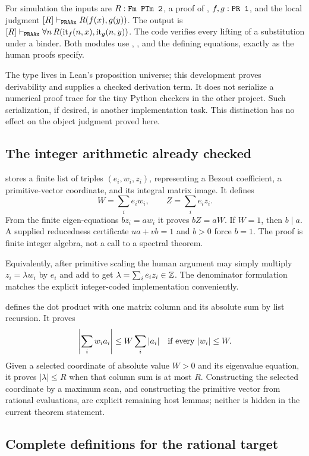 For simulation the inputs are $R:\texttt{Fm PTm 2}$, a proof of
, $f,g:\texttt{PR 1}$, and the local judgment
$[R]\vdash_{\texttt{PRAAx}}R(f(x),g(y))$. The output is
$[R]\vdash_{\texttt{PRAAx}}\forall n\,R(\operatorname{it}_f(n,x),\operatorname{it}_g(n,y))$.
The code verifies every lifting of a substitution under a binder.
Both modules use , ,
 and the defining equations, exactly as the human
proofs specify.

The type  lives in Lean's proposition universe; this
development proves derivability and supplies a checked derivation term.
It does not serialize a numerical proof trace for the tiny Python
checkers in the other project. Such serialization, if desired, is
another implementation task. This distinction has no effect on the
object judgment proved here.

\subsection{The integer arithmetic already checked}

 stores a finite list of triples
$(e_i,w_i,z_i)$, representing a Bezout coefficient, a primitive-vector
coordinate, and its integral matrix image. It defines
\[
          W=\sum_i e_iw_i,\qquad Z=\sum_i e_iz_i.
\]
From the finite eigen-equations $bz_i=aw_i$ it proves $bZ=aW$.
If $W=1$, then $b\mid a$. A supplied reducedness certificate
$ua+vb=1$ and $b>0$ force $b=1$. The proof is finite integer algebra,
not a call to a spectral theorem.

Equivalently, after primitive scaling the human argument may simply
multiply $z_i=\lambda w_i$ by $e_i$ and add to get
$\lambda=\sum_i e_i z_i\in\mathbb Z$. The denominator formulation
matches the explicit integer-coded implementation conveniently.

 defines the dot product with one matrix
column and its absolute sum by list recursion. It proves
\[
 \left|\sum_iw_i a_i\right|\le W\sum_i|a_i|
       \quad\hbox{if every }|w_i|\le W.
\]
Given a selected coordinate of absolute value $W>0$ and its eigenvalue
equation, it proves $|\lambda|\le R$ when that column sum is at
most $R$. Constructing the selected coordinate by a maximum scan,
and constructing the primitive vector from rational evaluations, are
explicit remaining host lemmas; neither is hidden in the current
theorem statement.

\subsection{Complete definitions for the rational target}

